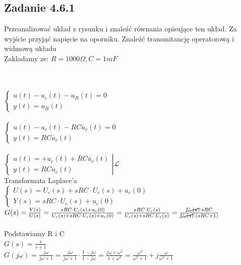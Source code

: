 \pagebreak
\subsection*{Zadanie 4.6.1} {\color{darkgray}
	\begin{figure}[!h]
	\end{figure}
	\noindent Przeanalizować układ z rysunku i znaleźć równania opisujące ten układ. Za wyjście
	przyjąć napięcie na oporniku. Znaleźć transmitancję operatorową i widmową układu\\
	Zakladamy ze: $R=1000\Omega,C=1mF$\\
}\lineh
\\\\
\noindent $\begin{cases}
u(t)-u_c(t)-u_R(t)=0\\
y(t)=u_R(t)
\end{cases}$\\\\
$\begin{cases}
u(t)-u_c(t)-RC\dot{u_c}(t)=0\\
y(t)=RC\dot{u_c}(t)
\end{cases}$\\\\
$\left.\begin{cases}
u(t)=+u_c(t)+RC\dot{u_c}(t)\\
y(t)=RC\dot{u_c}(t)
\end{cases}\right|\mathscr{L}$\\
Transformata Laplace'a\\
$\begin{cases}
U(s)=U_c(s)+sRC\cdot U_c(s)+u_c(0)\\
Y(s)=sRC\cdot U_c(s)+u_c(0)
\end{cases}$\\
$G(s)=\frac{Y(s)}{U(s)}=\frac{sRC\cdot U_c(s)+u_c(0)}{U_c(s)+sRC\cdot U_c(s)+u_c(0)}=\frac{sRC\cdot U_c(s)}{U_c(s)+sRC\cdot U_c(s)}=\frac{\cancel{U_c(s)}\cdot sRC}{\cancel{U_c(s)}\cdot (sRC+1)}$\\\\
Podstawiamy R i C\\
$G(s)=\frac{s}{s+1}$\\
$G(j\omega)=\frac{j\omega}{j\omega+1}=\frac{j\omega}{j\omega+1}\cdot \frac{1-j\omega}{1-j\omega}=\frac{j\omega+\omega^2}{1+\omega^2}=\frac{\omega^2}{\omega^2+1}+j\frac{\omega}{\omega^2+1}$



